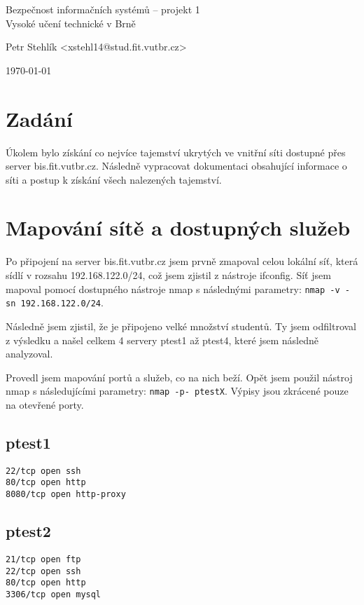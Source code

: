 \documentclass[11pt,a4paper]{article}
\begin{document}
\begin{center}
	\LARGE{Bezpečnost informačních systémů -- projekt 1}\\
	\large{Vysoké učení technické v Brně}
	\vspace{0.5cm}

	Petr Stehlík <xstehl14@stud.fit.vutbr.cz>

	\vspace{0.2cm}

	\today

\end{center}

\section{Zadání}
Úkolem bylo získání co nejvíce tajemství ukrytých ve vnitřní síti dostupné přes server bis.fit.vutbr.cz. Následně vypracovat dokumentaci obsahující informace o síti a postup k získání všech nalezených tajemství.

\section{Mapování sítě a dostupných služeb}

Po připojení na server bis.fit.vutbr.cz jsem prvně zmapoval celou lokální síť, která sídlí v rozsahu 192.168.122.0/24, což jsem zjistil z nástroje ifconfig. Síť jsem mapoval pomocí dostupného nástroje nmap s následnými parametry: \texttt{nmap -v -sn 192.168.122.0/24}.

Následně jsem zjistil, že je připojeno velké množství studentů. Ty jsem odfiltroval z výsledku a našel celkem 4 servery ptest1 až ptest4, které jsem následně analyzoval.

Provedl jsem mapování portů a služeb, co na nich beží. Opět jsem použil nástroj nmap s následujícími parametry: \texttt{nmap -p- ptestX}. Výpisy jsou zkrácené pouze na otevřené porty.

\subsection{ptest1}

\texttt{22/tcp   open  ssh\\
80/tcp   open  http\\
8080/tcp open  http-proxy
}

\subsection{ptest2}
\texttt{21/tcp   open  ftp\\
22/tcp   open  ssh\\
80/tcp   open  http\\
3306/tcp open  mysql
}
\end{document}
